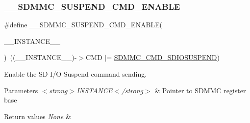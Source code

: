 \subsubsection{\texorpdfstring{\_\_SDMMC\_SUSPEND\_CMD\_ENABLE}{\_\_SDMMC\_SUSPEND\_CMD\_ENABLE}}
{\footnotesize\ttfamily \#define \+\_\+\+\_\+\+S\+D\+M\+M\+C\+\_\+\+S\+U\+S\+P\+E\+N\+D\+\_\+\+C\+M\+D\+\_\+\+E\+N\+A\+B\+LE(\begin{DoxyParamCaption}\item[{}]{\+\_\+\+\_\+\+I\+N\+S\+T\+A\+N\+C\+E\+\_\+\+\_\+ }\end{DoxyParamCaption})~((\+\_\+\+\_\+\+I\+N\+S\+T\+A\+N\+C\+E\+\_\+\+\_\+)-\/$>$C\+MD $\vert$= \mbox{\hyperlink{group___peripheral___registers___bits___definition_gaebb2a41639369a8c17cdb7b900b645a9}{S\+D\+M\+M\+C\+\_\+\+C\+M\+D\+\_\+\+S\+D\+I\+O\+S\+U\+S\+P\+E\+ND}})}



Enable the SD I/O Suspend command sending. 


\begin{DoxyParams}{Parameters}
{\em $<$strong$>$\+I\+N\+S\+T\+A\+N\+C\+E$<$/strong$>$} & Pointer to S\+D\+M\+MC register base\\
\hline
\end{DoxyParams}

\begin{DoxyRetVals}{Return values}
{\em None} & \\
\hline
\end{DoxyRetVals}
